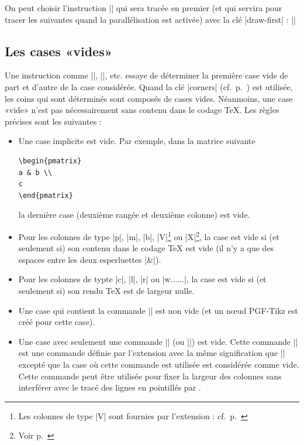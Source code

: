\documentclass[dvipsnames]{article}%
\begin{document}
\medskip
On peut choisir l'instruction |\Ddots| qui sera tracée en premier (et qui
servira pour tracer les suivantes quand la parallélisation est activée) avec la
clé |draw-first| : ||

\subsection{Les cases «vides»}

\label{empty-cells}
Une instruction comme |\Ldots|, |\Cdots|, etc. essaye de déterminer la première
case vide de part et d'autre de la case considérée. Quand la clé |corners|
(cf.~p.~\pageref{corners}) est utilisée, les coins qui sont déterminés sont
composés de cases vides. Néanmoins, une case «vide» n'est pas nécessairement
sans contenu dans le codage TeX. Les règles précises sont les suivantes :

\begin{itemize}
\item Une case implicite est vide. Par exemple, dans la matrice suivante

\begin{Verbatim}
\begin{pmatrix}
a & b \\
c
\end{pmatrix}
\end{Verbatim}

la dernière case (deuxième rangée et deuxième colonne) est vide.

\medskip
\item Pour les colonnes de type |p|, |m|, |b|, |V|\footnote{Les colonnes de type
  |V| sont fournies par l'extension : cf.~p.~\pageref{varwidth}}
ou |X|\footnote{Voir p.~\pageref{colonne-X}}, la case est vide si (et seulement
si) son contenu dans le codage TeX est vide (il n'y a que des espaces entre les
deux esperluettes |&|).

\medskip
\item Pour les colonnes de typte |c|, |l|, |r| ou |w{...}{...}|, la case est
vide si (et seulement si) son rendu TeX est de largeur nulle.

\medskip
\item Une case qui contient la commande |\NotEmpty| est non vide (et un nœud
PGF-Tikz est créé pour cette case).

\medskip
\item Une case avec seulement une commande |\Hspace| (ou |\Hspace*|) est vide.
Cette commande |\Hspace| est une commande définie par l'extension
 avec la même signification que |\hspace| excepté que la case où
cette commande est utilisée est considérée comme vide. Cette commande peut être
utilisée pour fixer la largeur des colonnes sans interférer avec le tracé des
lignes en pointillés par .
\end{itemize}
\end{document}
